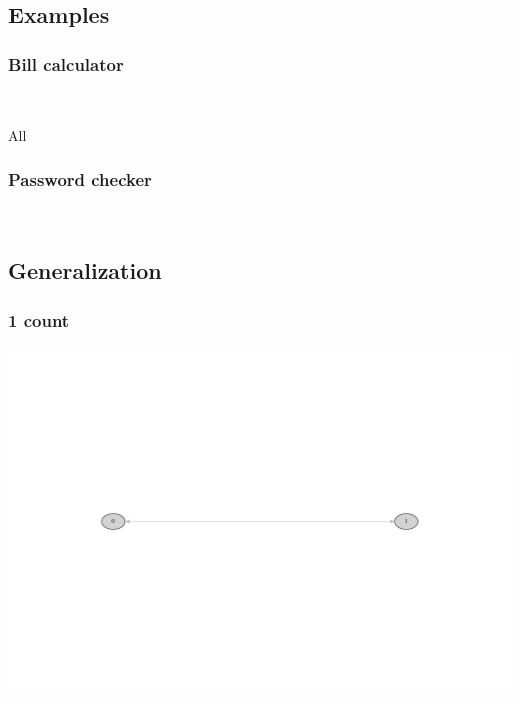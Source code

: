 \documentclass[10pt]{beamer}
\begin{document}
\subsection{Examples}
\begin{frame}
  \frametitle{Bill calculator}
  \centering

  \\[2em]

  \begin{block}{All}
    \centering
    \scalebox{.8}{}
  \end{block}
  \begin{block}{}
    \centering
    \scalebox{.8}{}
  \end{block}
\end{frame}

\begin{frame}
  \frametitle{Password checker}
  \centering

  \\
  \scalebox{0.4}{}
\end{frame}

\subsection{Generalization}
\begin{frame}
  \frametitle{1 count}
  \centering

  \includegraphics[width=\textwidth]{timed_automata/count1.pdf}
\end{frame}
\end{document}

